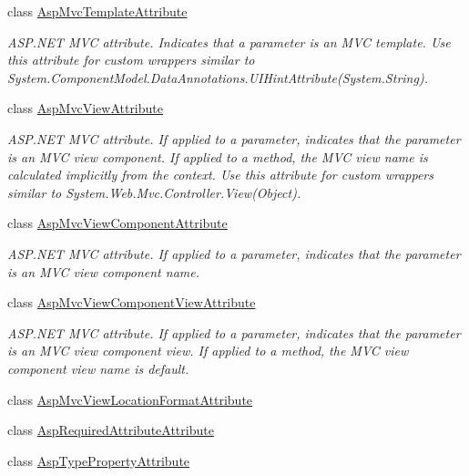 \begin{DoxyCompactItemize}
class \mbox{\hyperlink{class_r_f_storage_1_1_asp_mvc_template_attribute}{Asp\+Mvc\+Template\+Attribute}}
\begin{DoxyCompactList}\small\item\em A\+S\+P.\+N\+ET M\+VC attribute. Indicates that a parameter is an M\+VC template. Use this attribute for custom wrappers similar to {\ttfamily System.\+Component\+Model.\+Data\+Annotations.\+U\+I\+Hint\+Attribute(System.\+String)}. \end{DoxyCompactList}\item 
class \mbox{\hyperlink{class_r_f_storage_1_1_asp_mvc_view_attribute}{Asp\+Mvc\+View\+Attribute}}
\begin{DoxyCompactList}\small\item\em A\+S\+P.\+N\+ET M\+VC attribute. If applied to a parameter, indicates that the parameter is an M\+VC view component. If applied to a method, the M\+VC view name is calculated implicitly from the context. Use this attribute for custom wrappers similar to {\ttfamily System.\+Web.\+Mvc.\+Controller.\+View(\+Object)}. \end{DoxyCompactList}\item 
class \mbox{\hyperlink{class_r_f_storage_1_1_asp_mvc_view_component_attribute}{Asp\+Mvc\+View\+Component\+Attribute}}
\begin{DoxyCompactList}\small\item\em A\+S\+P.\+N\+ET M\+VC attribute. If applied to a parameter, indicates that the parameter is an M\+VC view component name. \end{DoxyCompactList}\item 
class \mbox{\hyperlink{class_r_f_storage_1_1_asp_mvc_view_component_view_attribute}{Asp\+Mvc\+View\+Component\+View\+Attribute}}
\begin{DoxyCompactList}\small\item\em A\+S\+P.\+N\+ET M\+VC attribute. If applied to a parameter, indicates that the parameter is an M\+VC view component view. If applied to a method, the M\+VC view component view name is default. \end{DoxyCompactList}\item 
class \mbox{\hyperlink{class_r_f_storage_1_1_asp_mvc_view_location_format_attribute}{Asp\+Mvc\+View\+Location\+Format\+Attribute}}
\item 
class \mbox{\hyperlink{class_r_f_storage_1_1_asp_required_attribute_attribute}{Asp\+Required\+Attribute\+Attribute}}
\item 
class \mbox{\hyperlink{class_r_f_storage_1_1_asp_type_property_attribute}{Asp\+Type\+Property\+Attribute}}

\end{DoxyCompactItemize}
